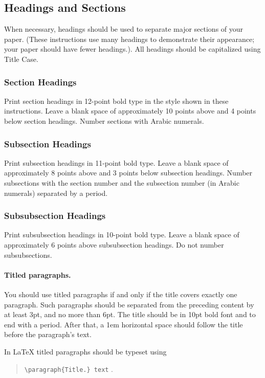 \documentclass{article}
\begin{document}
\subsection{Headings and Sections}

When necessary, headings should be used to separate major sections of
your paper. (These instructions use many headings to demonstrate their
appearance; your paper should have fewer headings.). All headings should be capitalized using Title Case.

\subsubsection{Section Headings}

Print section headings in 12-point bold type in the style shown in
these instructions. Leave a blank space of approximately 10 points
above and 4 points below section headings.  Number sections with
Arabic numerals.

\subsubsection{Subsection Headings}

Print subsection headings in 11-point bold type. Leave a blank space
of approximately 8 points above and 3 points below subsection
headings. Number subsections with the section number and the
subsection number (in Arabic numerals) separated by a
period.

\subsubsection{Subsubsection Headings}

Print subsubsection headings in 10-point bold type. Leave a blank
space of approximately 6 points above subsubsection headings. Do not
number subsubsections.

\paragraph{Titled paragraphs.} You should use titled paragraphs if and
only if the title covers exactly one paragraph. Such paragraphs should be
separated from the preceding content by at least 3pt, and no more than
6pt. The title should be in 10pt bold font and to end with a period.
After that, a 1em horizontal space should follow the title before
the paragraph's text.

In \LaTeX{} titled paragraphs should be typeset using
\begin{quote}
	{\tt \textbackslash{}paragraph\{Title.\} text} .
\end{quote}
\end{document}
